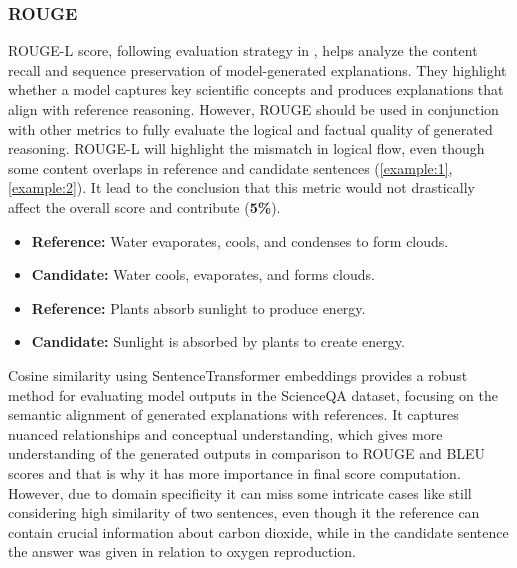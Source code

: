 \documentclass{article}
\begin{document}
\subsubsection{ROUGE}
ROUGE-L score, following evaluation strategy in \cite{lu2022learn}, helps analyze the content recall and sequence preservation of model-generated explanations. They highlight whether a model captures key scientific concepts and produces explanations that align with reference reasoning. However, ROUGE should be used in conjunction with other metrics to fully evaluate the logical and factual quality of generated reasoning. ROUGE-L will highlight the mismatch in logical flow, even though some content overlaps in reference and candidate sentences (\ref{example:1}, \ref{example:2}). It lead to the conclusion that this metric would not drastically affect the overall score and contribute (\textbf{5\%}).
\begin{example}
\label{example:1} 
\begin{itemize}
    \item \textbf{Reference:} Water evaporates, cools, and condenses to form clouds.
    \item \textbf{Candidate:} Water cools, evaporates, and forms clouds.
\end{itemize}
\end{example}
\begin{example}
\label{example:2}
\begin{itemize}
    \item \textbf{Reference:} Plants absorb sunlight to produce energy.
    \item \textbf{Candidate:} Sunlight is absorbed by plants to create energy.
\end{itemize}
\end{example}
Cosine similarity using SentenceTransformer embeddings provides a robust method for evaluating model outputs in the ScienceQA dataset, focusing on the semantic alignment of generated explanations with references. It captures nuanced relationships and conceptual understanding, which gives more understanding of the generated outputs in comparison to ROUGE and BLEU scores and that is why it has more importance in final score computation. However, due to domain specificity it can miss some intricate cases like still considering high similarity of two sentences, even though it the reference can contain crucial information about carbon dioxide, while in the candidate sentence the answer was given in relation to oxygen reproduction.
\end{document}
